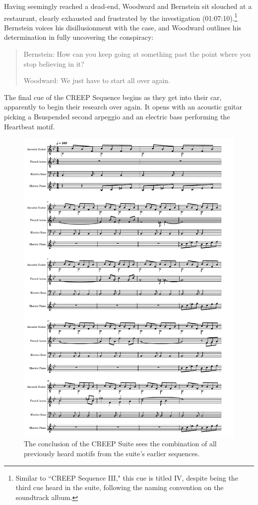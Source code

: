 Having seemingly reached a dead-end, Woodward and Bernstein sit slouched at a restaurant, clearly exhausted and frustrated by the investigation (01:07:10).\footnote{Similar to ``CREEP Sequence III," this cue is titled IV, despite being the third cue heard in the suite, following the naming convention on the soundtrack album.}
Bernstein voices his disillusionment with the case, and Woodward outlines his determination in fully uncovering the conspiracy:
\begin{quote}
Bernstein: How can you keep going at something past the point where you stop believing in it?

Woodward: We just have to start all over again.
\end{quote}
The final cue of the CREEP Sequence begins as they get into their car, apparently to begin their research over again.
It opens with an acoustic guitar picking a B\flat suspended second arpeggio and an electric bass performing the Heartbeat motif.


\begin{figure}
    \centering
    \includegraphics[width=1\linewidth]{img/president-creep-4.pdf}
    \caption{The conclusion of the CREEP Suite sees the combination of all previously heard motifs from the suite's earlier sequences.}
    \label{fig:president-creep-4}
\end{figure}

